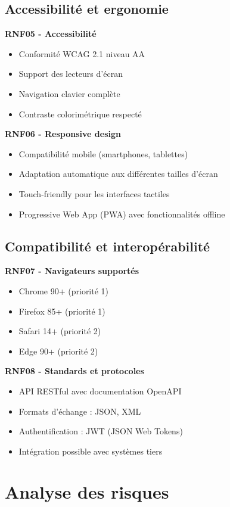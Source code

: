\subsection{Accessibilité et ergonomie}

\textbf{RNF05 - Accessibilité}
\begin{itemize}
\item Conformité WCAG 2.1 niveau AA
\item Support des lecteurs d'écran
\item Navigation clavier complète
\item Contraste colorimétrique respecté
\end{itemize}

\textbf{RNF06 - Responsive design}
\begin{itemize}
\item Compatibilité mobile (smartphones, tablettes)
\item Adaptation automatique aux différentes tailles d'écran
\item Touch-friendly pour les interfaces tactiles
\item Progressive Web App (PWA) avec fonctionnalités offline
\end{itemize}

\subsection{Compatibilité et interopérabilité}

\textbf{RNF07 - Navigateurs supportés}
\begin{itemize}
\item Chrome 90+ (priorité 1)
\item Firefox 85+ (priorité 1)
\item Safari 14+ (priorité 2)
\item Edge 90+ (priorité 2)
\end{itemize}

\textbf{RNF08 - Standards et protocoles}
\begin{itemize}
\item API RESTful avec documentation OpenAPI
\item Formats d'échange : JSON, XML
\item Authentification : JWT (JSON Web Tokens)
\item Intégration possible avec systèmes tiers
\end{itemize}

\section{Analyse des risques}

